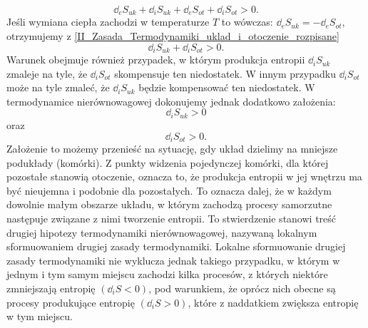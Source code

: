 \documentclass[10pt, a4paper, twoside, onecolumn]{article}
\numberwithin{equation}{section}
\begin{document}
	
	\begin{equation}\label{II_Zasada_Termodynamiki_uklad_i_otoczenie_rozpisane}
		\dd_{e}S_{uk}+\dd_{i}S_{uk}+\dd_{e}S_{ot}+\dd_{i}S_{ot}>0.
	\end{equation}
	Jeśli wymiana ciepła zachodzi w temperaturze \(T\) to wówczas: \(\dd_{e}S_{uk}=-\dd_{e}S_{ot}\), otrzymujemy z \eqref{II_Zasada_Termodynamiki_uklad_i_otoczenie_rozpisane} 
	\begin{equation}\label{}
		\dd_{i}S_{uk}+\dd_{i}S_{ot}>0.
	\end{equation}
	Warunek obejmuje również przypadek, w którym produkcja entropii \(\dd_{i}S_{uk}\) zmaleje na tyle, że \(\dd_{i}S_{ot}\) skompensuje ten niedostatek. W innym przypadku \(\dd_{i}S_{ot}\) może na tyle zmaleć, że \(\dd_{i}S_{uk}\) będzie kompensować ten niedostatek. W termodynamice nierównowagowej dokonujemy jednak dodatkowo założenia:
	\begin{equation*}
		\dd_{i}S_{uk}>0
	\end{equation*}
	oraz
	\begin{equation*}
		\dd_{i}S_{ot}>0.
	\end{equation*}
	Założenie to możemy przenieść na sytuację, gdy układ dzielimy na mniejsze podukłady (komórki). Z punkty widzenia pojedynczej komórki, dla której pozostałe stanowią otoczenie, oznacza to, że produkcja entropii w jej wnętrzu ma być nieujemna i podobnie dla pozostałych. To oznacza dalej, że w każdym dowolnie małym obszarze układu, w którym zachodzą procesy samorzutne następuje związane z nimi tworzenie entropii. To stwierdzenie stanowi treść drugiej hipotezy termodynamiki nierównowagowej, nazywaną lokalnym sformuowaniem drugiej zasady termodynamiki. Lokalne sformuowanie drugiej zasady termodynamiki nie wyklucza jednak takiego przypadku, w którym w jednym i tym samym miejscu zachodzi kilka procesów, z których niektóre zmniejszają entropię \((\dd_{i}S<0)\), pod warunkiem, że oprócz nich obecne są procesy produkujące entropię \((\dd_{i}S>0)\), które z naddatkiem zwiększa entropię w tym miejscu. 
	
\end{document}
